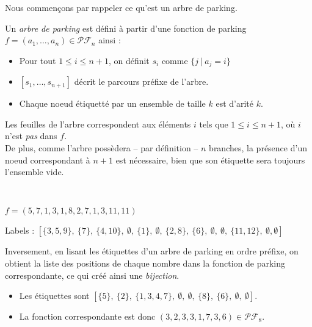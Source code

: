 Nous commençons par rappeler ce qu'est un arbre de parking.

\begin{definition}
    Un \emph{arbre de parking} est défini à partir d'une fonction de
    parking $f = (a_1, \ldots, a_n) \in \mathcal{PF}_n$ ainsi :
    \begin{itemize}
        \item Pour tout $1 \leqslant i \leqslant n+1$, on définit
            $s_i$ comme $\{j\ |\ a_j = i\}$
        \item $[s_1, \ldots, s_{n+1}]$ décrit le parcours préfixe de
            l'arbre.
        \item Chaque noeud étiquetté par un ensemble de taille $k$
            est d'arité $k$. 
    \end{itemize}
\end{definition}

\begin{rem}
    Les feuilles de l'arbre correspondent aux éléments $i$ tels que
    $1 \leqslant i \leqslant n + 1$, où $i$ n'est \emph{pas} dans $f$.\\
    De plus, comme l'arbre possèdera -- par définition -- $n$ branches,
    la présence d'un noeud correspondant à $n + 1$ est nécessaire, bien
    que son étiquette sera toujours l'ensemble vide.
\end{rem}

\begin{expl}[$n = 12$]
    ~\\
    \begin{itemize*}
        \item $f = (5, 7, 1, 3, 1, 8, 2, 7, 1, 3, 11, 11)$\\
        \item Labels : $[\{3, 5, 9\},\ \{7\},\ \{4, 10\},\ 
            \emptyset,\ \{1\},\ \emptyset,\ \{2,8\},\ 
            \{6\},\ \emptyset,\ \emptyset,\ \{11, 12\},\ 
            \emptyset, \emptyset]$
    \end{itemize*}
        
\end{expl}

Inversement, en lisant les étiquettes d'un arbre de parking en ordre
préfixe, on obtient la liste des positions de chaque nombre dans la fonction
de parking correspondante, ce qui créé ainsi une \emph{bijection}.

\begin{expl}[De l'arbre à la fonction]
    
    \begin{itemize}
        \item Les étiquettes sont $[\{5\},\ \{2\},\ \{1,3,4,7\},\ 
        \emptyset,\ \emptyset,\ \{8\},\ \{6\},\ \emptyset,\ 
        \emptyset]$.
        \item La fonction correspondante est donc
            $(3,2,3,3,1,7,3,6) \in \mathcal{PF}_8$.
    \end{itemize}
\end{expl}

